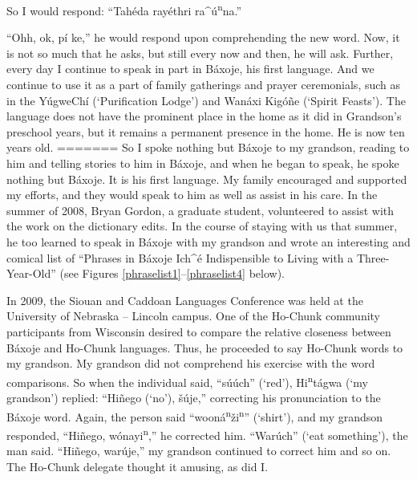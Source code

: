 \documentclass[output=paper]{LSP/langsci}
\begin{document}
So I would respond: ``Tah\'eda ray\'ethri ra\^{ }\'u\textsuperscript{n}na.''
	
``Ohh, ok, pí ke,'' he would respond upon comprehending the new word. Now, it is not so much that he asks, but still every now and then, he will ask. Further, every day I continue to speak in part in Báxoje, his first language. And we continue to use it as a part of family gatherings and prayer ceremonials, such as in the Y\'ugweChí (`Purification Lodge') and Wanáxi Kigóñe (`Spirit Feasts'). The language does not have the prominent place in the home as it did in Grandson's preschool years, but it remains a permanent presence in the home. He is now ten years old.
=======
So I spoke nothing but B\'axoje to my grandson, reading to him and telling stories to him in B\'axoje, and when he began to speak, he spoke nothing but B\'axoje. It is his first language. My family encouraged and supported my efforts, and they would speak to him as well as assist in his care. In the summer of 2008, Bryan Gordon, a graduate student, volunteered to assist with the work on the dictionary edits. In the course of staying with us that summer, he too learned to speak in B\'axoje with my grandson and wrote an interesting and comical list of ``Phrases in B\'axoje Ich\^{ }\'e Indispensible to Living with a Three-Year-Old'' (see Figures \ref{phraselist1}--\ref{phraselist4} below).

In 2009, the Siouan and Caddoan Languages Conference was held at the University of Nebraska -- Lincoln campus. One of the Ho-Chunk community participants from Wisconsin desired to compare the relative closeness between B\'axoje and Ho-Chunk languages. Thus, he proceeded to say Ho-Chunk words to my grandson. My grandson did not comprehend his exercise with the word comparisons. So when the individual said, ``s\'u\'uch'' (`red'), Hi\textsuperscript{n}t\'agwa (`my grandson') replied: ``Hi\~nego (`no'), \v{s}\'uje,'' correcting his pronunciation to the B\'axoje word. Again, the person said ``woon\'a\textsuperscript{n}\v{z}i\textsuperscript{n}'' (`shirt'), and my grandson responded, ``Hi\~nego, w\'onayi\textsuperscript{n},'' he corrected him. ``War\'uch'' (`eat something'), the man said. ``Hi\~nego, war\'uje,'' my grandson continued to correct him and so on. The Ho-Chunk delegate thought it amusing, as did I.
\end{document}
